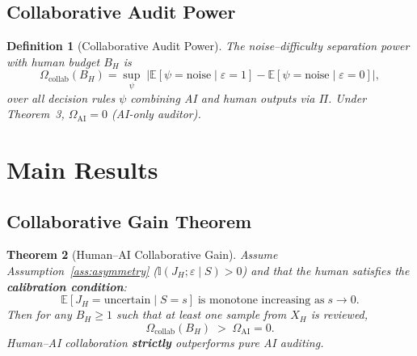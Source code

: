 \documentclass[12pt,a4paper]{article}
\newtheorem{theorem}{Theorem}[section]
\newtheorem{definition}[theorem]{Definition}
\newcommand{\E}{\mathbb{E}}
\newcommand{\I}{\mathbb{I}}
\begin{document}
\subsection{Collaborative Audit Power}

\begin{definition}[Collaborative Audit Power]
\label{def:omega}
The noise--difficulty separation power with human budget $B_H$ is
\begin{equation}\label{eq:omega}
    \Omega_{\mathrm{collab}}(B_H) =
    \sup_{\psi}\; \big|
    \E[\psi = \text{noise} \mid \varepsilon = 1] -
    \E[\psi = \text{noise} \mid \varepsilon = 0] \big|,
\end{equation}
over all decision rules $\psi$ combining AI and human outputs via $\Pi$.
Under Theorem~3, $\Omega_{\mathrm{AI}} = 0$ (AI-only auditor).
\end{definition}

\section{Main Results}

\subsection{Collaborative Gain Theorem}

\begin{theorem}[Human--AI Collaborative Gain]
\label{thm:collab-gain}
Assume Assumption~\ref{ass:asymmetry} ($\I(J_H; \varepsilon \mid S) > 0$) and
that the human satisfies the \textbf{calibration condition}:
\begin{equation}\label{eq:calibration}
    \E[J_H = \text{uncertain} \mid S = s]
    \;\text{is monotone increasing as}\; s \to 0.
\end{equation}
Then for any $B_H \geq 1$ such that at least one sample from $X_H$ is
reviewed,
\begin{equation}\label{eq:collab-gain-result}
    \Omega_{\mathrm{collab}}(B_H) \;>\; \Omega_{\mathrm{AI}} = 0.
\end{equation}
Human--AI collaboration \textbf{strictly} outperforms pure AI auditing.
\end{theorem}
\end{document}
